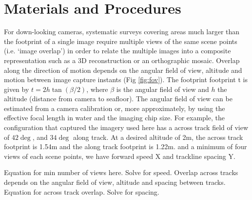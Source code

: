 \section{Materials and Procedures}


For down-looking cameras, systematic surveys covering areas much larger than the footprint of a single image require multiple views of the same scene points (i.e. `image overlap') in order to relate the multiple images into a composite representation such as a 3D reconstruction or an orthographic mosaic. Overlap along the direction of motion depends on the angular field of view, altitude and motion between image capture instants (Fig \ref{fig:fov}). The footprint footprint t is given by $t = 2 h \tan(\beta/2)$, where $\beta$ is the angular field of view and $h$ the altitude (distance from camera to seafloor). The angular field of view can be estimated from a camera calibration or, more approximately, by using the effective focal length in water and the imaging chip size. For example, the configuration that captured the imagery used here has a across track field of view of $42\deg$, and $34\deg$ along track. At a desired altitude of 2m, the across track footprint is 1.54m and the along track footprint is 1.22m.  and a minimum of four views of each scene points, we have forward speed X and trackline spacing Y. 

Equation for min number of views here. Solve for speed.
Overlap across tracks depends on the angular field of view, altitude and spacing between tracks. 
Equation for across track overlap. Solve for spacing.

